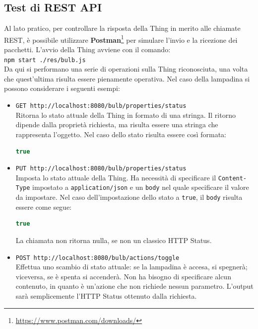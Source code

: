 \documentclass[12pt,a4paper,openright,oneside]{report}
\begin{document}
\subsection{Test di REST API}
Al lato pratico, per controllare la risposta della Thing in merito alle chiamate REST, è possibile utilizzare \textbf{Postman}\footnote{\url{https://www.postman.com/downloads/}} per simulare l'invio e la ricezione dei pacchetti. L'avvio della Thing avviene con il comando:\\
\texttt{npm start ./res/bulb.js}\\

Da qui si performano una serie di operazioni sulla Thing riconosciuta, una volta che quest'ultima risulta essere pienamente operativa. Nel caso della lampadina si possono considerare i seguenti esempi:

\begin{itemize}
	\item \texttt{GET http://localhost:8080/bulb/properties/status}\\
	Ritorna lo stato attuale della Thing in formato di una stringa. Il ritorno dipende dalla proprietà richiesta, ma risulta essere una stringa che rappresenta l'oggetto. Nel caso dello stato risulta essere così formata:
	\begin{lstlisting}[language=JavaScript]
	  true
	\end{lstlisting}
	
	\item \texttt{PUT http://localhost:8080/bulb/properties/status}\\
	Imposta lo stato attuale della Thing. Ha necessità di specificare il \texttt{Content-Type} impostato a \texttt{application/json} e un \texttt{body} nel quale specificare il valore da impostare. Nel caso dell'impostazione dello stato a \texttt{true}, il \texttt{body} risulta essere come segue: 
	\begin{lstlisting}[language=JavaScript]
	  true
	\end{lstlisting}
	La chiamata non ritorna nulla, se non un classico HTTP Status.

	\item \texttt{POST http://localhost:8080/bulb/actions/toggle}\\
	Effettua uno scambio di stato attuale: se la lampadina è accesa, si spegnerà; viceversa, se è spenta si accenderà. Non ha bisogno di specificare alcun contenuto, in quanto è un'azione che non richiede nessun parametro. L'output sarà semplicemente l'HTTP Status ottenuto dalla richiesta.
\end{itemize}
\end{document}
